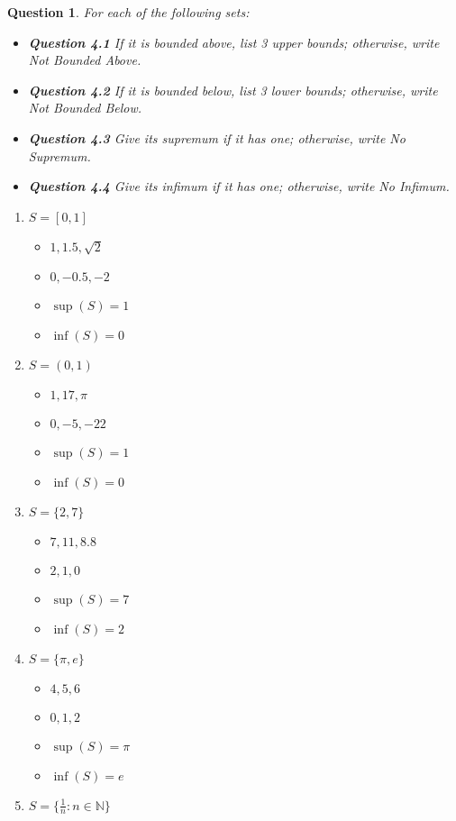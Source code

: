 \documentclass[10pt,a4paper]{article}
\newtheorem*{question*}{Question}
\theoremstyle{definition}
\begin{document}
\begin{question*}
For each of the following sets:
\begin{itemize}
\item \textbf{Question 4.1} If it is bounded above, list 3 upper bounds; otherwise, write Not Bounded Above.
\item \textbf{Question 4.2} If it is bounded below, list 3 lower bounds; otherwise, write Not Bounded Below.
\item \textbf{Question 4.3} Give its supremum if it has one; otherwise, write No Supremum.
\item \textbf{Question 4.4} Give its infimum if it has one; otherwise, write No Infimum.
\end{itemize}
\end{question*}
\begin{enumerate}[label = (\alph*)]
\item $S = [0,1]$ 
\begin{itemize}
\item $1, 1.5, \sqrt{2}$
\item $0, -0.5, -2$
\item $\sup(S) = 1$
\item $\inf(S) = 0$
\end{itemize}
\item $S = (0,1)$
\begin{itemize}
\item $1, 17, \pi$
\item $0, -5, -22$
\item $\sup(S) = 1$
\item $\inf(S) = 0$
\end{itemize}
\item $S = \{2,7\}$
\begin{itemize}
\item $7, 11, 8.8$
\item $2, 1, 0$
\item $\sup(S) = 7$
\item $\inf(S) = 2$
\end{itemize}
\item $S = \{\pi, e\}$
\begin{itemize}
\item $4, 5, 6$
\item $0, 1, 2$
\item $\sup(S) = \pi$
\item $\inf(S) = e$
\end{itemize}
\item $S = \{\frac{1}{n} : n \in \mathbb{N}\}$

\end{enumerate}
\end{document}
